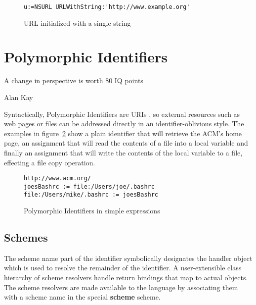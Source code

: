 \documentclass[preprint,authoryear]{acm_proc_article-sp}
\begin{document}
\begin{figure}[htbp]
\begin{center}
\begin{small}
\begin{verbatim}
u:=NSURL URLWithString:'http://www.example.org'
\end{verbatim}
\end{small}
\caption{URL initialized with a single string}
\label{url-as-string}
\end{center}
\end{figure}





\section{Polymorphic Identifiers}
\epigraph{A change in perspective is worth 80 IQ points}{Alan Kay}

Syntactically, Polymorphic Identifiers are URIs \cite{rfc3986}, so external resources
such as web pages or files can be addressed directly in an identifier-oblivious
style.  The examples in figure~\ref{first-polymorphic-examples} show a plain
identifier that will retrieve the ACM's home page, an assignment that will read
the contents of a file into a local variable and finally an assignment that will
write the contents of the local variable to a file, effecting a file copy operation.


\begin{figure}[htbp]
\begin{center}
\begin{small}
\begin{verbatim}
http://www.acm.org/
joesBashrc := file:/Users/joe/.bashrc
file:/Users/mike/.bashrc := joesBashrc
\end{verbatim}
\end{small}
\caption{Polymorphic Identifiers in simple expressions}
\label{first-polymorphic-examples}
\end{center}
\end{figure}



\subsection{Schemes}

The scheme name part of the identifier symbolically designates the handler object which 
is used to resolve the remainder of the identifier.   A user-extensible class hierarchy of
scheme resolvers handle 
return bindings that map to actual objects. The scheme resolvers are made available to the 
language by associating them with a scheme name in the special {\bf scheme} scheme.
\end{document}
